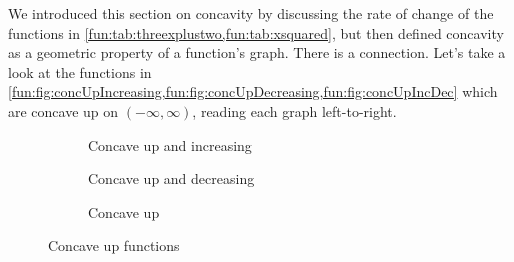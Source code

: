We introduced this section on concavity by discussing the rate of change of the functions in  \cref{fun:tab:threexplustwo,fun:tab:xsquared}, but then defined concavity as a geometric property of a function's graph. There is a connection. Let's take a look at the functions in \cref{fun:fig:concUpIncreasing,fun:fig:concUpDecreasing,fun:fig:concUpIncDec} which are concave up on $(-\infty,\infty)$, reading each graph left-to-right.

\begin{figure}[!htb]
	\begin{widepage}
	\centering
    \begin{subfigure}{.3\textwidth}
    \caption{Concave up and increasing}
    \label{fun:fig:concUpIncreasing}
    \end{subfigure}%
    \hfill
    \begin{subfigure}{.3\textwidth}
    \caption{Concave up and decreasing}
	\label{fun:fig:concUpDecreasing}
    \end{subfigure}%
    \hfill
    \begin{subfigure}{.3\textwidth}
    \caption{Concave up}
	\label{fun:fig:concUpIncDec}
    \end{subfigure}
  \caption{Concave up functions}
  \end{widepage}
\end{figure}

